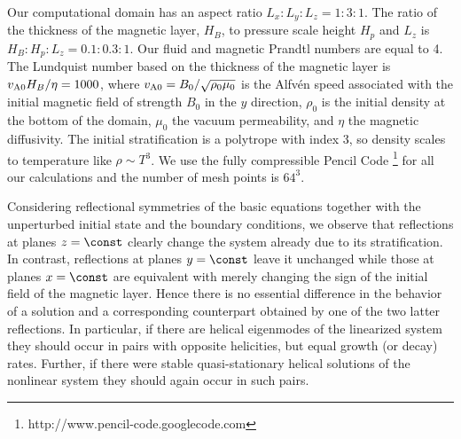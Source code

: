 \documentclass[twocolumn,showpacs,preprintnumbers,superscriptaddress]{revtex4}
\begin{document}
Our computational domain has an aspect ratio $L_x:L_y:L_z=1:3:1$.
The ratio of the thickness of the magnetic layer, $H_B$, to
pressure scale height $H_p$ and $L_z$ is $H_B:H_p:L_z=0.1:0.3:1$.
Our fluid and magnetic Prandtl numbers are equal to 4.
The Lundquist number based on the thickness of the magnetic layer
is $v_{\rm A0}H_B/\eta=1000$,
where $v_{\rm
A0}=B_0/\sqrt{\rho_0\mu_0}$ is the Alfv\'en speed associated with the
initial magnetic field of strength $B_0$ in the $y$ direction,
$\rho_0$ is the initial density
at the bottom of the domain, $\mu_0$ the vacuum permeability, and $\eta$ the magnetic diffusivity.
The initial stratification is a polytrope with index 3,
so density scales to temperature like $\rho\sim T^3$.
We use the fully compressible {\sc Pencil Code} \footnote{
http://www.pencil-code.googlecode.com} for all our calculations
and the number of mesh points is $64^3$.

Considering reflectional symmetries of the basic equations together with
the unperturbed initial state and the boundary conditions, we observe
that reflections at planes $z=\const$ clearly change the system already
due to its stratification.
In contrast, reflections at planes $y=\const$ leave it unchanged while
those at planes $x=\const$ are equivalent with merely changing the sign
of the initial field of the magnetic layer.
Hence there is no essential difference in the behavior of a solution and
a corresponding counterpart obtained by one of the two latter reflections.
In particular, if there are helical eigenmodes of the linearized system
they should occur in pairs with opposite helicities, but equal growth (or
decay) rates.
Further, if there were stable quasi-stationary helical solutions of the
nonlinear system they should again occur in such pairs.
\end{document}
